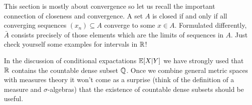 This section is mostly about convergence so let us recall the important connection of closeness and convergence. A set $A$ is closed if and only if all converging sequences $(x_n)\subseteq A$ converge to some $x\in A$. Formulated differently, $\bar A$ consists precisely of those elements which are the limits of sequences in $A$. Just check yourself some examples for intervals in $\mathbb{R}$! \smallskip

In the discussion of conditional expactations $\mathbb{E}[X|Y]$ we have strongly used that $\mathbb{R}$ contains the countable dense subset $\mathbb{Q}$. Once we combine general metric spaces with measures theory it won't come as a surprise (think of the definition of a measure and $\sigma$-algebras) that the existence of countable dense subsets should be useful.



